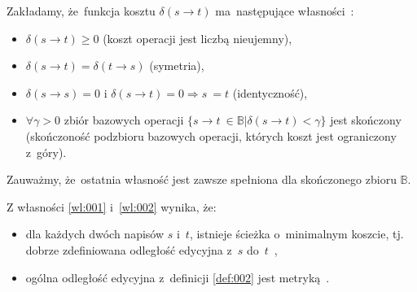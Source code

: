 \documentclass{praca1}
\begin{document}
\begin{property}\label{wl:002}
Zakładamy, że~funkcja kosztu $\delta(s \rightarrow t)$ ma~następujące własności~\cite{Boytsov2011:indexingmethods}:
\begin{itemize}
\item $\delta(s \rightarrow t) \geq 0$ (koszt operacji jest liczbą nieujemny),
\item $\delta(s \rightarrow t) = \delta(t \rightarrow s)$ (symetria),
\item $\delta(s \rightarrow s) = 0\text{ i~} \delta(s \rightarrow t) = 0 \Rightarrow s~= t$ (identyczność),
\item $\forall \gamma > 0$ zbiór bazowych operacji $\{s \rightarrow t~\in \mathbb{B} | \delta(s \rightarrow t) < \gamma \}$ jest skończony (skończoność podzbioru bazowych operacji, których koszt jest ograniczony z~góry).
\end{itemize}
\end{property}

Zauważmy, że~ostatnia własność jest zawsze spełniona dla skończonego zbioru $\mathbb{B}$.

\begin{theorem}
Z własności \ref{wl:001} i~\ref{wl:002} wynika, że:
\begin{itemize}
\item dla każdych dwóch napisów $s$ i~$t$, istnieje ścieżka o~minimalnym koszcie, tj. dobrze zdefiniowana odległość edycyjna z~$s$ do~$t$~\cite{Boytsov2011:indexingmethods},
\item ogólna odległość edycyjna z~definicji \ref{def:002} jest metryką~\cite{Wagner1974:stringtostring}.
\end{itemize}
\end{theorem}
\end{document}
